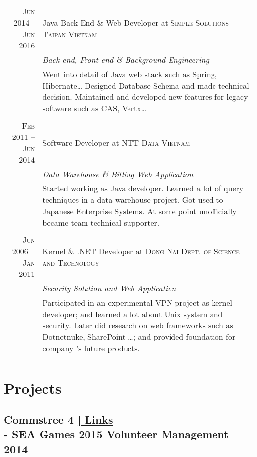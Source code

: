 \documentclass[a4paper,10pt]{article}
\begin{document}
\begin{tabular}{r|p{11cm}}

  \textsc{Jun 2014 - Jun 2016} & Java Back-End \& Web Developer at \textsc{Simple Solutions Taipan Vietnam} \\
  &\emph{Back-end, Front-end \& Background Engineering}\\
  &\footnotesize{
    Went into detail of Java web stack such as Spring, Hibernate\ldots
    Designed Database Schema and made technical decision.
    Maintained and developed new features for legacy software such as CAS, Vertx\ldots}\\
  \multicolumn{2}{c}{} \\

  \textsc{Feb 2011 – Jun 2014} & Software Developer at \textsc{NTT Data Vietnam} \\
  &\emph{Data Warehouse \& Billing Web Application}\\
  &\footnotesize{
    Started working as Java developer.
    Learned a lot of query techniques in a data warehouse project.
    Got used to Japanese Enterprise Systems.
    At some point unofficially became team technical supporter.}\\
  \multicolumn{2}{c}{} \\

  \textsc{Jun 2006 – Jan 2011} & Kernel \& .NET Developer at \textsc{Dong Nai Dept. of Science and Technology} \\
  &\emph{Security Solution and Web Application}\\
  &\footnotesize{
    Participated in an experimental VPN project as kernel developer;
    and learned a lot about Unix system and security.
    Later did research on web frameworks such as Dotnetnuke, SharePoint \ldots;
    and provided foundation for company 's future products.}\\
  \multicolumn{2}{c}{} \\

\end{tabular}

\section{Projects}

\subsection*{Commstree 4 \hfill \footnotesize {\hyperlink{ct-links}{| Links}}\\\large - SEA Games 2015 Volunteer Management\\\small 2014}
\end{document}
